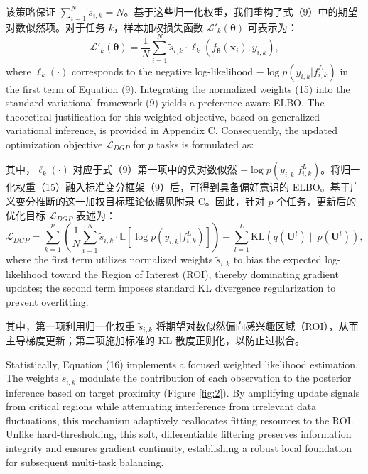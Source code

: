 \documentclass[11pt]{article}
\begin{document}
该策略保证 $\sum_{i=1}^{N} \tilde{s}_{i,k} = N$。基于这些归一化权重，我们重构了式（9）中的期望对数似然项。对于任务 $k$，样本加权损失函数 $\mathcal{L}'_{k}(\boldsymbol{\theta})$ 可表示为：
\begin{equation}
	{{{\mathcal{L}}'}_{k}}(\boldsymbol{\theta })=\frac{1}{N}\sum\limits_{i=1}^{N}{{{{\tilde{s}}}_{i,k}}}\cdot {{\ell }_{k}}({{f}_{\boldsymbol{\theta }}}({{\mathbf{x}}_{i}}),{{y}_{i,k}}),
\end{equation}
where $\ell_{k}(\cdot)$ corresponds to the negative log-likelihood $-\log p(y_{i,k}|f_{i,k}^{L})$ in the first term of Equation (9). Integrating the normalized weights (15) into the standard variational framework (9) yields a preference-aware ELBO. The theoretical justification for this weighted objective, based on generalized variational inference, is provided in Appendix C. Consequently, the updated optimization objective $\mathcal{L}_{DGP}$ for $p$ tasks is formulated as:

其中，$\ell_{k}(\cdot)$ 对应于式（9）第一项中的负对数似然 $-\log p(y_{i,k}|f_{i,k}^{L})$。将归一化权重（15）融入标准变分框架（9）后，可得到具备偏好意识的 ELBO。基于广义变分推断的这一加权目标理论依据见附录 C。因此，针对 $p$ 个任务，更新后的优化目标 $\mathcal{L}_{DGP}$ 表述为：
\begin{equation}
	{{\mathcal{L}}_{DGP}}=\sum\limits_{k=1}^{p}{\left( \frac{1}{N}\sum\limits_{i=1}^{N}{{{{\tilde{s}}}_{i,k}}}\cdot \mathbb{E}\left[ \log p({{y}_{i,k}}|f_{i,k}^{L}) \right] \right)}-\sum\limits_{l=1}^{L}{\text{KL}}\left( q({{\mathbf{U}}^{l}})\|p({{\mathbf{U}}^{l}}) \right),
\end{equation}
where the first term utilizes normalized weights $\tilde{s}_{i,k}$ to bias the expected log-likelihood toward the Region of Interest (ROI), thereby dominating gradient updates; the second term imposes standard KL divergence regularization to prevent overfitting.

其中，第一项利用归一化权重 $\tilde{s}_{i,k}$ 将期望对数似然偏向感兴趣区域（ROI），从而主导梯度更新；第二项施加标准的 KL 散度正则化，以防止过拟合。

Statistically, Equation (16) implements a focused weighted likelihood estimation. The weights $\tilde{s}_{i,k}$ modulate the contribution of each observation to the posterior inference based on target proximity (Figure \ref{fig:2}). By amplifying update signals from critical regions while attenuating interference from irrelevant data fluctuations, this mechanism adaptively reallocates fitting resources to the ROI. Unlike hard-thresholding, this soft, differentiable filtering preserves information integrity and ensures gradient continuity, establishing a robust local foundation for subsequent multi-task balancing.
\end{document}
